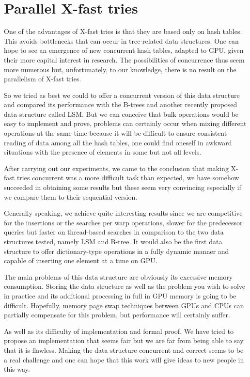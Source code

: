 \section{Parallel X-fast tries}

One of the advantages of X-fast tries is that they are based only on hash tables. This avoids bottlenecks that can occur in tree-related data structures. One can hope to see an emergence of new concurrent hash tables, adapted to GPU, given their more capital interest in research. The possibilities of concurrence thus seem more numerous but, unfortunately, to our knowledge, there is no result on the parallelism of X-fast tries.

So we tried as best we could to offer a concurrent version of this data structure and compared its performance with the B-trees and another recently proposed data structure called LSM. But we can conceive that bulk operations would be easy to implement and prove, problems can certainly occur when mixing different operations at the same time because it will be difficult to ensure consistent reading of data among all the hash tables, one could find oneself in awkward situations with the presence of elements in some but not all levels.

After carrying out our experiments, we came to the conclusion that making X-fast tries concurrent was a more difficult task than expected, we have somehow succeeded in obtaining some results but these seem very convincing especially if we compare them to their sequential version.

Generally speaking, we achieve quite interesting results since we are competitive for the insertions or the searches per warp operations, slower for the predecessor queries but faster on thread-based searches in comparison to the two data structures tested, namely LSM and B-tree. It would also be the first data structure to offer dictionary-type operations in a fully dynamic manner and capable of inserting one element at a time on GPU.

The main problems of this data structure are obviously its excessive memory consumption. Storing the data structure as well as the problem you wish to solve in practice and its additional processing in full in GPU memory is going to be difficult. Hopefully, memory page swap techniques between GPUs and CPUs can partially compensate for this problem, but performance will certainly suffer.

As well as its difficulty of implementation and formal proof. We have tried to propose an implementation that seems fair but we are far from being able to say that it is flawless. Making the data structure concurrent and correct seems to be a real challenge and one can hope that this work will give ideas to new people in this way.